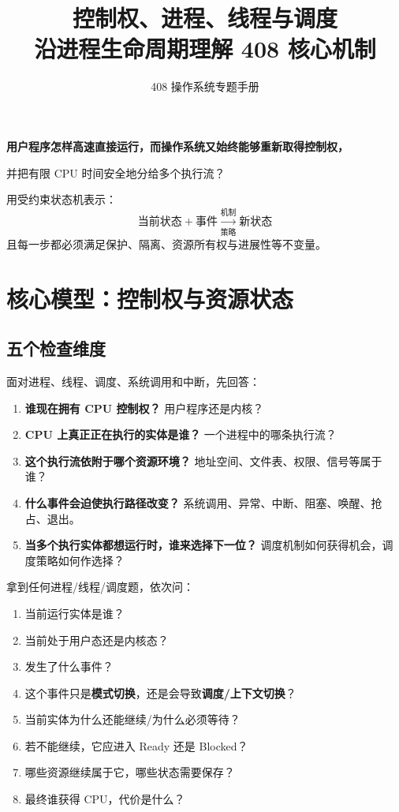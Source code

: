 \documentclass[11pt,a4paper]{ctexart}
\title{\vspace{-1.2cm}\textbf{控制权、进程、线程与调度}\\[0.4em]
\large 沿进程生命周期理解 408 核心机制}
\author{408 操作系统专题手册}
\date{}
\newcommand{\kw}[1]{\textbf{#1}}
\begin{document}
\maketitle
\begin{corebox}[核心问题]

\begin{center}
\Large\bfseries 用户程序怎样高速直接运行，而操作系统又始终能够重新取得控制权，\par
并把有限 CPU 时间安全地分给多个执行流？
\end{center}

用受约束状态机表示：
\[
\boxed{\text{当前状态}+\text{事件}\xrightarrow[\text{策略}]{\text{机制}}\text{新状态}}
\]
且每一步都必须满足保护、隔离、资源所有权与进展性等不变量。
\end{corebox}

\tableofcontents
\newpage

\section{核心模型：控制权与资源状态}

\subsection{五个检查维度}

面对进程、线程、调度、系统调用和中断，先回答：

\begin{enumerate}
  \item \kw{谁现在拥有 CPU 控制权？} 用户程序还是内核？
  \item \kw{CPU 上真正正在执行的实体是谁？} 一个进程中的哪条执行流？
  \item \kw{这个执行流依附于哪个资源环境？} 地址空间、文件表、权限、信号等属于谁？
  \item \kw{什么事件会迫使执行路径改变？} 系统调用、异常、中断、阻塞、唤醒、抢占、退出。
  \item \kw{当多个执行实体都想运行时，谁来选择下一位？} 调度机制如何获得机会，调度策略如何作选择？
\end{enumerate}

\begin{method}[进程与调度八问]
拿到任何进程/线程/调度题，依次问：
\begin{enumerate}
\item 当前运行实体是谁？
\item 当前处于用户态还是内核态？
\item 发生了什么事件？
\item 这个事件只是\kw{模式切换}，还是会导致\kw{调度/上下文切换}？
\item 当前实体为什么还能继续/为什么必须等待？
\item 若不能继续，它应进入 Ready 还是 Blocked？
\item 哪些资源继续属于它，哪些状态需要保存？
\item 最终谁获得 CPU，代价是什么？
\end{enumerate}
\end{method}
\end{document}
